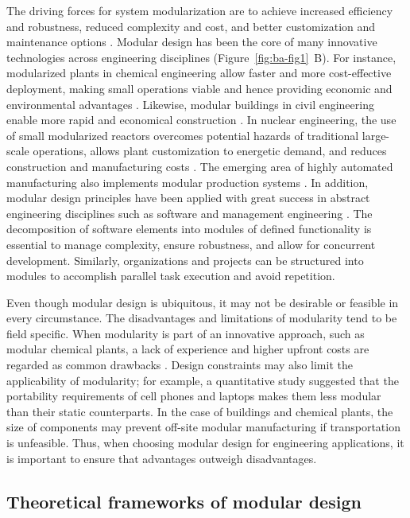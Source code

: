 The driving forces for system modularization are to achieve increased efficiency and robustness, reduced complexity and cost, and better customization and maintenance options \citep{bonvoisin2016, miller1998}.
Modular design has been the core of many innovative technologies across engineering disciplines (Figure~\ref{fig:ba-fig1}~B).
For instance, modularized plants in chemical engineering allow faster and more cost-effective deployment, making small operations viable and hence providing economic and environmental advantages \citep{baldea2017, kim2017}.
Likewise, modular buildings in civil engineering enable more rapid and economical construction \citep{kamali2016}.
In nuclear engineering, the use of small modularized reactors overcomes potential hazards of traditional large-scale operations, allows plant customization to energetic demand, and reduces construction and manufacturing costs \citep{RN137}.
The emerging area of highly automated manufacturing also implements modular production systems \citep{weyer2015}.
In addition, modular design principles have been applied with great success in abstract engineering disciplines such as software \citep{abelson1996, gancarz2003} and management engineering \citep{campagnolo2010}.
The decomposition of software elements into modules of defined functionality is essential to manage complexity, ensure robustness, and allow for concurrent development.
Similarly, organizations and projects can be structured into modules to accomplish parallel task execution and avoid repetition.

Even though modular design is ubiquitous, it may not be desirable or feasible in every circumstance.
The disadvantages and limitations of modularity tend to be field specific.
When modularity is part of an innovative approach, such as modular chemical plants, a lack of experience and higher upfront costs are regarded as common drawbacks \citep{baldea2017}.
Design constraints may also limit the applicability of modularity; for example, a quantitative study \citep{RN26} suggested that the portability requirements of cell phones and laptops makes them less modular than their static counterparts.
In the case of buildings and chemical plants, the size of components may prevent off-site modular manufacturing if transportation is unfeasible.
Thus, when choosing modular design for engineering applications, it is important to ensure that advantages outweigh disadvantages.

\subsection{Theoretical frameworks of modular design}

